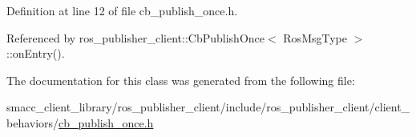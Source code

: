 Definition at line 12 of file cb\+\_\+publish\+\_\+once.\+h.



Referenced by ros\+\_\+publisher\+\_\+client\+::\+Cb\+Publish\+Once$<$ Ros\+Msg\+Type $>$\+::on\+Entry().



The documentation for this class was generated from the following file\+:\begin{DoxyCompactItemize}
\item 
smacc\+\_\+client\+\_\+library/ros\+\_\+publisher\+\_\+client/include/ros\+\_\+publisher\+\_\+client/client\+\_\+behaviors/\hyperlink{cb__publish__once_8h}{cb\+\_\+publish\+\_\+once.\+h}\end{DoxyCompactItemize}
